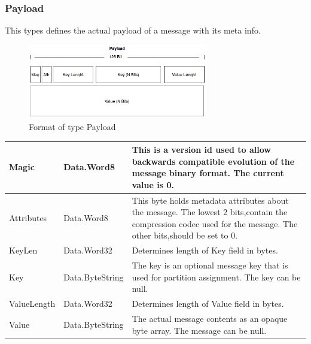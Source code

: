 \subsubsection{Payload}
This types defines the actual payload of a message with its meta info.

\begin{figure}[H]
    \centering
    \includegraphics[width=0.7\textwidth]{images/impl-prot-types-payload.png}
    \caption{Format of type Payload}
    \label{fig:impl-prot-types-payload}
\end{figure}

\begin{table}[H]
\centering
\begin{tabular}{ l  l  p{10cm} }
\hline
Magic       & Data.Word8      & This is a version id used to allow backwards compatible evolution of the message binary format. The current value is 0.                                         \\ \hline
Attributes  & Data.Word8      & This byte holds metadata attributes about the message. The lowest 2 bits,contain the compression codec used for the message. The other bits,should be set to 0. \\ \hline
KeyLen      & Data.Word32     & Determines length of Key field in bytes.                                                                                                                         \\ \hline
Key         & Data.ByteString & The key is an optional message key that is used for partition assignment. The key can be null.                                                                  \\ \hline
ValueLength & Data.Word32     & Determines length of Value field in bytes.                                                                                                                      \\ \hline
Value       & Data.ByteString & The actual message contents as an opaque byte array. The message can be null.                                                                                   \\ \hline
\end{tabular}
\end{table}

